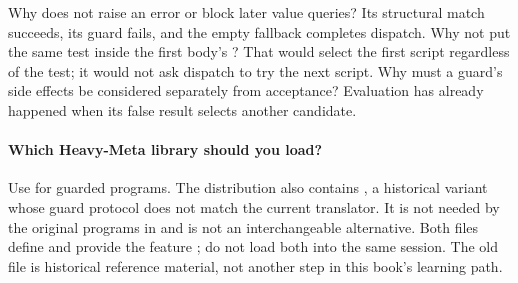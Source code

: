 Why does \code{[:add -100]} not raise an error or block later value queries?
Its structural match succeeds, its guard fails, and the empty fallback
completes dispatch. Why not put the same test inside the first body's
? That would select the first script regardless of the test;
it would not ask dispatch to try the next script. Why must a guard's
side effects be considered separately from acceptance? Evaluation has
already happened when its false result selects another candidate.

\paragraph{Which Heavy-Meta library should you load?}
Use  for guarded programs. The distribution
also contains , a historical variant
whose guard protocol does not match the current translator. It is not
needed by the original programs in  and is not an
interchangeable alternative. Both files define  and
provide the feature ; do not load both into the same
session. The old file is historical reference material, not another
step in this book's learning path.
